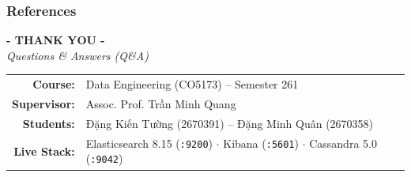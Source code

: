\documentclass[aspectratio=169]{beamer}
\newcommand{\vn}[1]{\foreignlanguage{vietnamese}{#1}}
\begin{document}
\begin{frame}[allowframebreaks]
\frametitle{References}
\nocite{*}
\printbibliography[heading=none]
\end{frame}

\begin{frame}
    \centering
    \vspace{0.8cm}
    \textbf{\Huge{- THANK YOU -}}\\[0.3cm]
    \textit{\Large{Questions \& Answers (Q\&A)}}\\[0.6cm]
    \small
    \begin{tabular}{rl}
        \textbf{Course:} & Data Engineering (CO5173) -- Semester 261 \\
        \textbf{Supervisor:} & Assoc. Prof. \vn{Trần Minh Quang} \\
        \textbf{Students:} & \vn{Đặng Kiến Tường} (2670391) -- \vn{Đặng Minh Quân} (2670358) \\
        \textbf{Live Stack:} & Elasticsearch 8.15 (\texttt{:9200}) $\cdot$ Kibana (\texttt{:5601}) $\cdot$ Cassandra 5.0 (\texttt{:9042})
    \end{tabular}
\end{frame}
\end{document}
